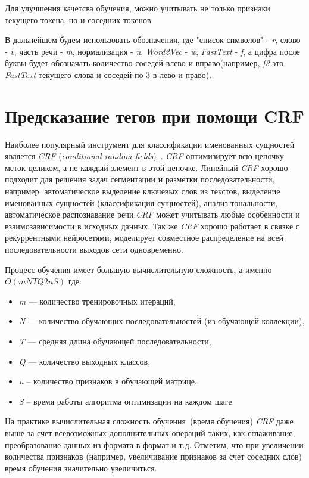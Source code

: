 \documentclass{csmathnotes}
\begin{document}
Для улучшения качетсва обучения, можно учитывать не только признаки текущего токена, но и соседних токенов.

В дальнейшем будем использовать обозначения, где "список символов" - \emph{r}, слово - \emph{v}, часть речи - \emph{m}, нормализация - \emph{n}, \emph{Word2Vec} - \emph{w}, \emph{FastText} - \emph{f}, а цифра после буквы будет обозначать количество соседей влево и вправо(например, \emph{f3} это \emph{FastText} текущего слова и соседей по $3$ в лево и право).

\section*{Предсказание тегов при помощи CRF}
Наиболее  популярный инструмент для классификации именованных сущностей является \emph{CRF} (\emph{conditional random fields})~\cite{HabrCRF}. \emph{CRF} оптимизирует всю цепочку меток целиком, а не каждый элемент в этой цепочке.  Линейный \emph{CRF} хорошо подходит для решения задач сегментации и разметки последовательности, например: автоматическое выделение ключевых слов из текстов, выделение именованных сущностей (классификация сущностей), анализ тональности, автоматическое распознавание речи.\emph{CRF} может учитывать любые особенности и взаимозависимости в исходных данных. Так же \emph{CRF} хорошо работает в связке с рекуррентными нейросетями, моделирует совместное распределение на всей последовательности выходов сети одновременно.


Процесс обучения имеет большую вычислительную сложность, а именно $O(mNTQ2nS)$ где:
\begin{itemize}
    \item \emph{m} — количество тренировочных итераций,
    \item \emph{N} — количество обучающих последовательностей (из обучающей коллекции),
    \item \emph{T} — средняя длина обучающей последовательности,
    \item \emph{Q} — количество выходных классов,
    \item \emph{n} – количество признаков в обучающей матрице,
    \item \emph{S} – время работы алгоритма оптимизации на каждом шаге. 
\end{itemize}


На практике вычислительная сложность обучения~(время обучения) \emph{CRF} даже выше за счет всевозможных дополнительных операций таких, как сглаживание, преобразование данных из формата в формат и т.д. Отметим, что при увеличении количества признаков (например, увеличивание признаков  за счет соседних слов) время обучения значительно увеличиться. 
\end{document}
